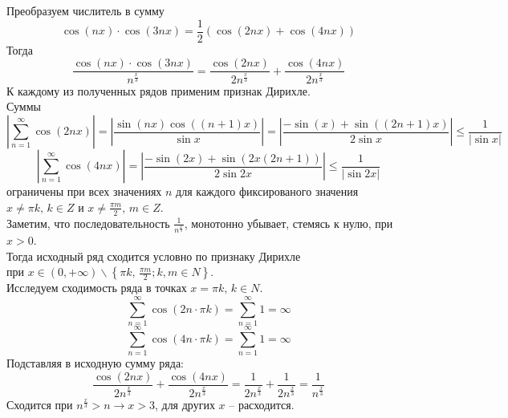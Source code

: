 \documentclass[a5paper, 10pt]{article}
\theoremstyle{definition}
\theoremstyle{plain}
\theoremstyle{remark}
\begin{document}
Преобразуем числитель в сумму
\begin{equation*}
\cos( nx) \cdot \cos (3nx) = \frac{1}{2}\left( \cos(2nx) + \cos(4nx) \right)
\end{equation*}
Тогда
\begin{equation*}
\frac{\cos( nx) \cdot \cos (3nx) }{n^{\frac{x}{3}}} = \frac{\cos( 2nx) }{2n^{\frac{x}{3}}}+\frac{ \cos (4nx) }{2n^{\frac{x}{3}}}
\end{equation*}
К каждому из полученных рядов применим признак Дирихле.\\
Суммы 
\begin{equation*}
\left| \sum \limits_{n = 1}^{\infty} \cos( 2nx) \right| = \left| \frac{\sin (n x) \cos((n+1)x)}{\sin x} \right| =
 \left| \frac{-\sin (x) +  \sin((2n+1)x)}{2\sin x} \right| \leq \frac{1}{ \left|\sin x\right|}
\end{equation*}
\begin{equation*}
\left| \sum \limits_{n = 1}^{\infty} \cos( 4nx) \right| = \left| \frac{-\sin (2x) +  \sin(2x(2n+1))}{2\sin 2x} \right| \leq \frac{1}{ \left|\sin 2x\right|}
\end{equation*}
ограничены при всех значениях $n$ для каждого фиксированого значения $x \neq \pi k, \, k \in Z$ и $x \neq \frac{\pi m}{2}, \, m \in Z$.\\
Заметим, что  последовательность $\frac{1}{n^{\frac{x}{3}}}$, монотонно убывает, стемясь к нулю, при $x > 0$. \\
Тогда исходный ряд сходится условно по признаку Дирихле\\
 при $x \in (0, + \infty) \backslash \left\{\pi k, \, \frac{\pi m}{2};  k, m \in N \right\} $. \\

Исследуем сходимость ряда в точках $x = \pi k, \, k \in N$.
\begin{equation*}
\sum \limits_{n = 1}^{\infty} \cos( 2n\cdot \pi k) = \sum \limits_{n = 1}^{\infty} 1 = \infty
\end{equation*}
\begin{equation*}
\sum \limits_{n = 1}^{\infty} \cos( 4n\cdot \pi k) = \sum \limits_{n = 1}^{\infty} 1 = \infty
\end{equation*}
Подставляя в исходную сумму ряда:
\begin{equation*}
 \frac{\cos( 2nx) }{2n^{\frac{x}{3}}}+\frac{ \cos (4nx) }{2n^{\frac{x}{3}}} = \frac{1 }{2n^{\frac{x}{3}}}+\frac{1 }{2n^{\frac{x}{3}}} = \frac{1 }{n^{\frac{x}{3}}}
\end{equation*}
Сходится при $n^{\frac{x}{3}} > n \to x > 3$, для других $x$ -- расходится.\\
\end{document}
